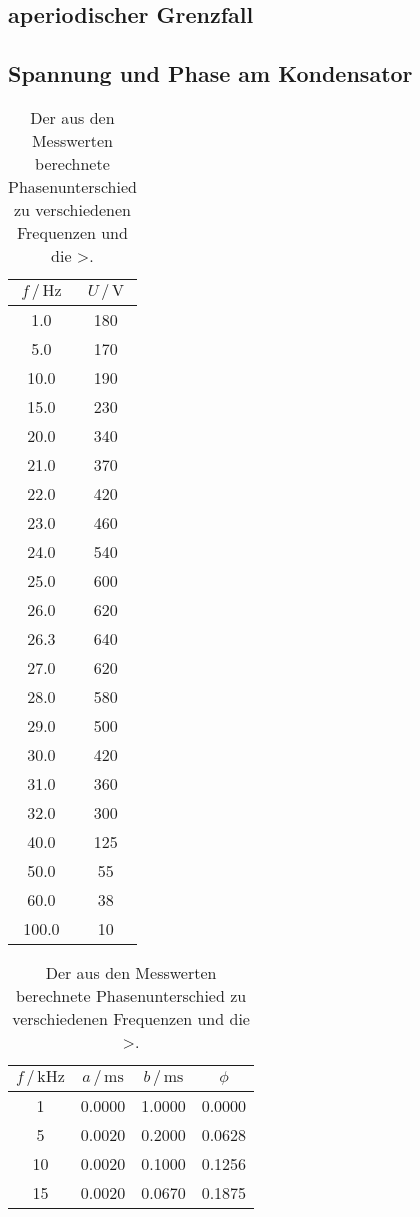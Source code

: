 \subsection{aperiodischer Grenzfall}


\subsection{Spannung und Phase am Kondensator}

\begin{table}
\centering
\caption{Der aus den Messwerten berechnete Phasenunterschied zu verschiedenen Frequenzen und die >.}
\begin{tabular}[t]{cc|}
    \toprule
    $f \, / \, \si{\hertz}$ & $U \, / \, \si{\V}$\\
    \midrule
    1.0& 180    \\
    5.0& 170\\
    10.0& 190\\
    15.0& 230\\
    20.0& 340\\
    21.0& 370\\
    22.0& 420\\
    23.0& 460\\
    24.0& 540\\
    25.0& 600\\
    26.0& 620\\
    26.3& 640\\
    27.0& 620\\
    28.0& 580\\
    29.0& 500\\
    30.0& 420\\
    31.0& 360\\
    32.0& 300\\
    40.0& 125\\
    50.0& 55\\
    60.0& 38\\
    100.0& 10\\
    \bottomrule
\end{tabular}
\begin{tabular}[t]{|cccc}
    \toprule
    $f \,/\, \si{\kilo\hertz}$ & $a \,/\, \si{\milli\second}$ &  $b \,/\, \si{\milli\second}$ & $\phi$\\
    \midrule
    1& 0.0000& 1.0000& 0.0000\\
    5& 0.0020& 0.2000& 0.0628\\
    10& 0.0020& 0.1000&  0.1256\\
    15& 0.0020& 0.0670& 0.1875 \\

\end{tabular}
\end{table}
